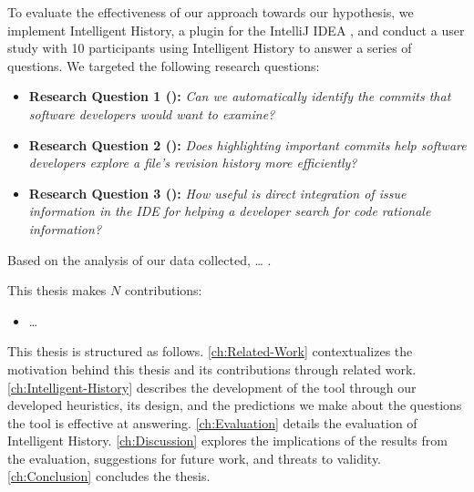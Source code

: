 To evaluate the effectiveness of our approach towards our hypothesis, we implement Intelligent History, a plugin for the IntelliJ IDEA ,
and conduct a user study with 10 participants using Intelligent History to answer a series of questions.
We targeted the following research questions:

\begin{itemize}[leftmargin=*]
    \item[] \textbf{Research Question 1 ():} \textit{Can we automatically identify the commits that software developers would want to examine?}
    \item[] \textbf{Research Question 2 ():} \textit{Does highlighting important commits help software developers explore a file’s revision history more efficiently?}
    \item[] \textbf{Research Question 3 ():} \textit{How useful is direct integration of issue information in the IDE for helping a developer search for code rationale information?}
\end{itemize}

Based on the analysis of our data collected, \dots
{}.

This thesis makes $N$ contributions:
\begin{itemize}
	\item \dots {}
\end{itemize}

This thesis is structured as follows. 
\autoref{ch:Related-Work} contextualizes the motivation behind this thesis and its contributions through related work. 
\autoref{ch:Intelligent-History} describes the development of the tool through our developed heuristics, its design, and the predictions we make about the questions the tool is effective at answering. 
\autoref{ch:Evaluation} details the evaluation of Intelligent History.
\autoref{ch:Discussion} explores the implications of the results from the evaluation, suggestions for future work, and threats to validity.
\autoref{ch:Conclusion} concludes the thesis.

\endinput

Any text after an \endinput is ignored.
You could put scraps here or things in progress.
